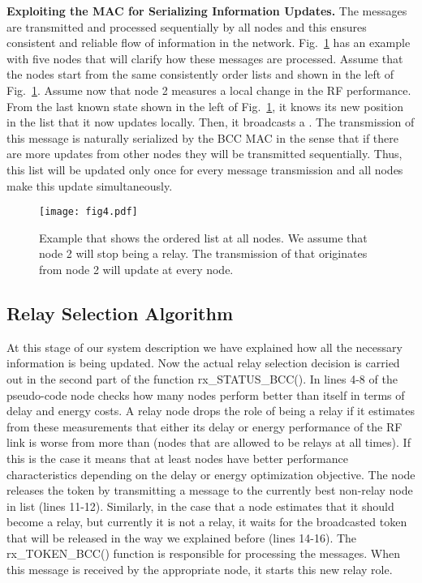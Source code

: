 \documentclass[10pt]{IEEEtran}
\newcounter{section:outage-analysis}
\begin{document}
\textbf{Exploiting the MAC for Serializing Information Updates.}
The  messages are transmitted and processed sequentially by all nodes and this ensures consistent and reliable flow of information in the network.  Fig.~\ref{fig:example-status-bcc-message} has an example with five nodes that will clarify how these messages are processed. Assume that the nodes start from the same consistently order lists  and  shown in the left of Fig.~\ref{fig:example-status-bcc-message}. Assume now that node 2 measures a local change in the RF performance. From the last known state shown in the left of Fig.~\ref{fig:example-status-bcc-message}, it knows its new position in the list  that it now updates locally. Then, it broadcasts a . The transmission of this message is naturally serialized by the BCC MAC in the sense that if there are more updates from other nodes they will be transmitted sequentially. Thus, this list will be updated only once for every  message transmission and all nodes make this update simultaneously.

\begin{figure}[t]
\texttt{[image: fig4.pdf]}
\caption{Example that shows the ordered list  at all nodes. We assume that node 2 will stop being a relay. The transmission of  that originates from node 2 will update  at every node.
}
\label{fig:example-status-bcc-message}
\end{figure}



\subsection{Relay Selection Algorithm}
\label{subsection:3}
At this stage of our system description we have explained how all the necessary information is being updated. Now the actual relay selection decision is carried out in the second part of the function rx\_STATUS\_BCC(). In lines 4-8 of the pseudo-code node  checks how many nodes perform better than itself in terms of delay and energy costs. A relay node drops the role of being a relay if it estimates from these measurements that either its delay or energy performance of the RF link is worse from more than  (nodes that are allowed to be relays at all times). If this is the case it means that at least  nodes have better performance characteristics depending on the delay or energy optimization objective. The node releases the token by transmitting a message  to the currently best non-relay node in list  (lines 11-12). Similarly, in the case that a node estimates that it should become a relay, but currently it is not a relay, it waits for the broadcasted token that will be released in the way we explained before (lines 14-16). The rx\_TOKEN\_BCC() function is responsible for processing the  messages. When this message is received by the appropriate node, it starts this new relay role.
\end{document}
